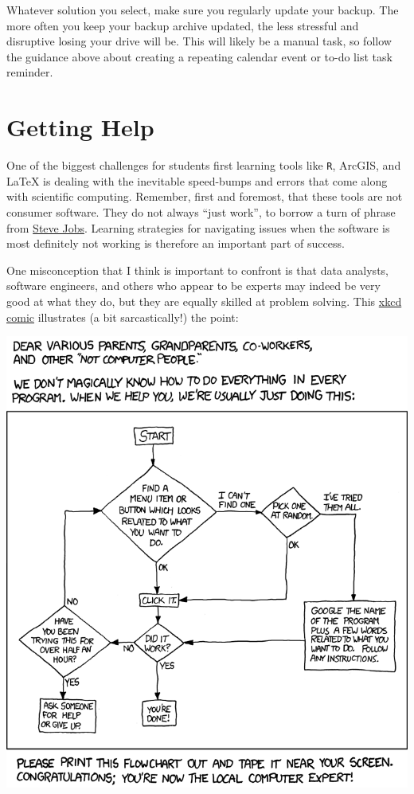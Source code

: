 \documentclass[]{book}
\theoremstyle{definition}
\theoremstyle{definition}
\theoremstyle{definition}
\theoremstyle{remark}
\begin{document}
Whatever solution you select, make sure you regularly update your
backup. The more often you keep your backup archive updated, the less
stressful and disruptive losing your drive will be. This will likely be
a manual task, so follow the guidance above about creating a repeating
calendar event or to-do list task reminder.

\hypertarget{getting-help}{\chapter{Getting Help}\label{getting-help}}

One of the biggest challenges for students first learning tools like
\texttt{R}, ArcGIS, and LaTeX is dealing with the inevitable speed-bumps
and errors that come along with scientific computing. Remember, first
and foremost, that these tools are not consumer software. They do not
always ``just work'', to borrow a turn of phrase from
\href{https://en.wikipedia.org/wiki/Steve_Jobs}{Steve Jobs}. Learning
strategies for navigating issues when the software is most definitely
not working is therefore an important part of success.

One misconception that I think is important to confront is that data
analysts, software engineers, and others who appear to be experts may
indeed be very good at what they do, but they are equally skilled at
problem solving. This \href{https://www.xkcd.com/627/}{xkcd comic}
illustrates (a bit sarcastically!) the point:

\begin{center}\includegraphics[width=0.75\linewidth]{images/tech_support_cheat_sheet} \end{center}
\end{document}
